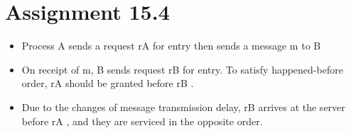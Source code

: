 \section{Assignment 15.4}
\begin{itemize}
	\item Process A sends a request rA for entry then sends a message m to B
	\item On receipt of m, B sends request rB for entry. To satisfy happened-before order, rA should be granted before rB . 
	\item Due to the changes of message transmission delay, rB arrives at the server before rA , and they are serviced in the opposite order. 
\end{itemize}


	

